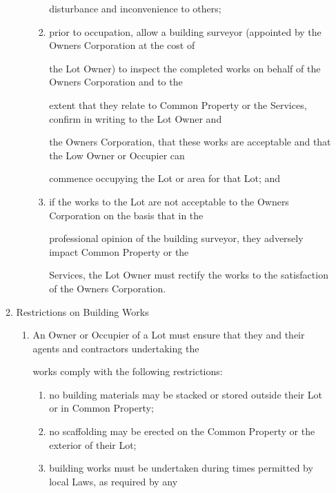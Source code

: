 \documentclass{article}
\begin{document}
\begin{enumerate}[label=\arabic*.]
\begin{enumerate}[label=\arabic{enumi}.\arabic*.]
\begin{enumerate}[label=(\arabic*)]
\begin{enumerate}[label=(\alph*)]
{\fontsize{10.02}{1}disturbance and inconvenience to others; }

\item {\fontsize{9.962}{1} prior to occupation, allow a building surveyor (appointed by the Owners Corporation at the cost of }

{\fontsize{10.02}{1}the Lot Owner) to inspect the completed works on behalf of the Owners Corporation and to the }

{\fontsize{10.02}{1}extent that they relate to Common Property or the Services, confirm in writing to the Lot Owner and }

{\fontsize{10.02}{1}the Owners Corporation, that these works are acceptable and that the Low Owner or Occupier can }

{\fontsize{10.02}{1}commence occupying the Lot or area for that Lot; and }

\item {\fontsize{9.962}{1} if the works to the Lot are not acceptable to the Owners Corporation on the basis that in the }

{\fontsize{10.02}{1}professional opinion of the building surveyor, they adversely impact Common Property or the }

{\fontsize{10.02}{1}Services, the Lot Owner must rectify the works to the satisfaction of the Owners Corporation. }

\end{enumerate}
\end{enumerate}
\item {\fontsize{9.99}{1} Restrictions on Building Works }

\begin{enumerate}[label=(\arabic*)]
\item {\fontsize{9.962}{1} An Owner or Occupier of a Lot must ensure that they and their agents and contractors undertaking the }

{\fontsize{10.02}{1}works comply with the following restrictions: }

\begin{enumerate}[label=(\alph*)]
\item {\fontsize{9.962}{1} no building materials may be stacked or stored outside their Lot or in Common Property; }

\item {\fontsize{9.962}{1} no scaffolding may be erected on the Common Property or the exterior of their Lot; }

\item {\fontsize{9.962}{1} building works must be undertaken during times permitted by local Laws, as required by any }


\end{enumerate}
\end{enumerate}
\end{enumerate}
\end{enumerate}
\end{document}
